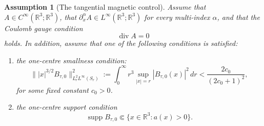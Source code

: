 \documentclass[10pt%
]{amsart}
\numberwithin{equation}{section}
\newcommand{\R}{\mathbb{R}}
\newtheorem{assumption}{Assumption}[section]
\theoremstyle{definition}
\def\div{\mathop{\mathrm{div}}\nolimits}
\begin{document}
	\begin{assumption}[The tangential magnetic control]\label{assum:Assumpcond}
		Assume that $A\in C^\infty(\R^3;\R^3)$, that $\partial_x^\alpha A\in L^\infty(\R^3;\R^3)$ for every multi-index $\alpha$, and that the Coulomb gauge condition
		\[
		\div A=0
		\]
		holds. In addition, assume that one of the following conditions is satisfied:
		\begin{enumerate}
			\item[(i)] the one-centre smallness condition:  
			\begin{equation}\label{equ:Btaucond}
				\big\||x|^{3/2}B_{\tau,0}\big\|_{L_r^2L^\infty(S_r)}^2
				:=\int_0^\infty r^3\sup_{|x|=r}|B_{\tau,0}(x)|^2\,dr<\frac{2c_0}{(2c_0+1)^2},
			\end{equation}
            for some fixed constant $c_0>0$.
			\item[(ii)] the one-centre support condition
			\begin{equation}\label{control_B}
				\operatorname{supp}B_{\tau,0}\Subset\{x\in\R^3:a(x)>0\}.
			\end{equation}
		\end{enumerate}
	\end{assumption}
\end{document}
